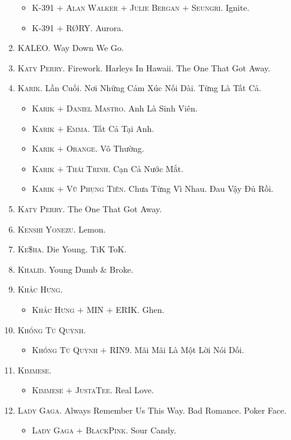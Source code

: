 \documentclass[oneside]{book}
\numberwithin{equation}{section}
\begin{document}
\begin{enumerate}
\begin{itemize}
		\item \textsc{K-391 $+$ Alan Walker $+$ Julie Bergan $+$ Seungri.} Ignite.
		\item \textsc{K-391 $+$ R{\O}RY.} Aurora.
	\end{itemize}
	\item \textsc{KALEO.} Way Down We Go.
	\item \textsc{Katy Perry.} Firework. Harleys In Hawaii. The One That Got Away.
	\item \textsc{Karik.} Lần Cuối. Nơi Những Cảm Xúc Nối Dài. Từng Là Tất Cả.
	\begin{itemize}
		\item \textsc{Karik $+$ Daniel Mastro.} Anh Là Sinh Viên.
		\item \textsc{Karik $+$ Emma.} Tất Cả Tại Anh.
		\item \textsc{Karik $+$ Orange.} Vô Thường.
		\item \textsc{Karik $+$ Thái Trinh.} Cạn Cả Nước Mắt.
		\item \textsc{Karik $+$ Vũ Phụng Tiên.} Chưa Từng Vì Nhau. Đau Vậy Đủ Rồi.
	\end{itemize}	
	\item \textsc{Katy Perry.} The One That Got Away.
	\item \textsc{Kenshi Yonezu.} Lemon.
	\item \textsc{Ke\$ha.} Die Young. TiK ToK.
	\item \textsc{Khalid.} Young Dumb \& Broke.
	\item \textsc{Khắc Hưng.}
	\begin{itemize}
		\item \textsc{Khắc Hưng $+$ MIN $+$ ERIK.} Ghen.
	\end{itemize}
	\item \textsc{Khổng Tú Quỳnh.}
	\begin{itemize}
		\item \textsc{Khổng Tú Quỳnh $+$ RIN9.} Mãi Mãi Là Một Lời Nói Dối.
	\end{itemize}
	\item \textsc{Kimmese.}
	\begin{itemize}
		\item \textsc{Kimmese $+$ JustaTee.} Real Love.
	\end{itemize}
	\item \textsc{Lady Gaga.} Always Remember Us This Way. Bad Romance. Poker Face.
	\begin{itemize}
		\item \textsc{Lady Gaga $+$ BlackPink.} Sour Candy.

\end{itemize}
\end{enumerate}
\end{document}
